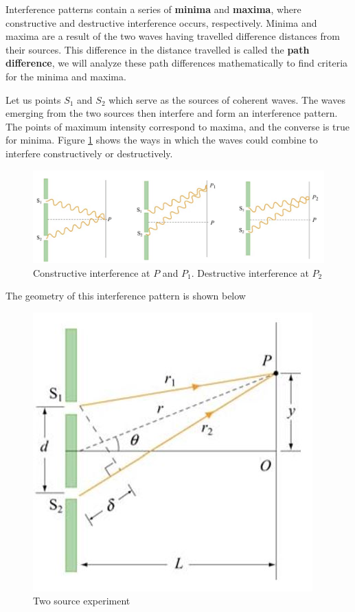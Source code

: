 Interference patterns contain a series of \textbf{minima} and \textbf{maxima}, where constructive and destructive interference occurs, respectively. Minima and maxima are a result of the two waves having travelled difference distances from their sources. This difference in the distance travelled is called the \textbf{path difference}, we will analyze these path differences mathematically to find criteria for the minima and maxima. 

Let us points $S_1$ and $S_2$ which serve as the sources of coherent waves. The waves emerging from the two sources then interfere and form an interference pattern. The points of maximum intensity correspond to maxima, and the converse is true for minima. Figure \ref{fig:interference-at-points} shows the ways in which the waves could combine to interfere constructively or destructively. 

\begin{figure}[h!]
    \centering
    \includegraphics[scale=0.5]{notes/images/Interference-Two-Source-1.JPG}
    \caption{Constructive interference at $P$ and $P_1$. Destructive interference at $P_2$}
    \label{fig:interference-at-points}
\end{figure}
\FloatBarrier

The geometry of this interference pattern is shown below

\begin{figure}[h!]
    \centering
    \includegraphics[scale=0.6]{notes/images/Interference-Two-Source-2.JPG}
    \caption{Two source experiment}
\end{figure}
\FloatBarrier

